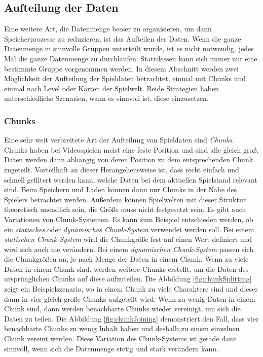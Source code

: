 \subsection{Aufteilung der Daten} 
Eine weitere Art, die Datenmenge besser zu organisieren, um dann Speicherprozesse zu reduzieren, ist das Aufteilen der Daten. Wenn die ganze Datenmenge in sinnvolle Gruppen unterteilt wurde, ist es nicht notwendig, jedes Mal die ganze Datenmenge zu durchlaufen. Stattdessen kann sich immer nur eine bestimmte Gruppe vorgenommen werden. In diesem Abschnitt werden zwei Möglichkeit der Aufteilung der Spieldaten betrachtet, einmal mit Chunks und einmal nach Level oder Karten der Spielwelt. Beide Strategien haben unterschiedliche Szenarien, wann es sinnvoll ist, diese einzusetzen.

\subsubsection{Chunks} \label{sssect:chunks}
Eine sehr weit verbreitete Art der Aufteilung von Spieldaten sind \textit{Chunks}. Chunks haben bei Videospielen meist eine feste Position und sind alle gleich groß. Daten werden dann abhängig von deren Position zu dem entsprechenden Chunk zugeteilt. Vorteilhaft an dieser Herangehensweise ist, dass recht einfach und schnell gefiltert werden kann, welche Daten bei dem aktuellen Spielstand relevant sind. Beim Speichern und Laden können dann nur Chunks in der Nähe des Spielers betrachtet werden. Außerdem können Spielwelten mit dieser Struktur theoretisch unendlich sein, die Größe muss nicht festgesetzt sein. Es gibt auch Variationen von Chunk-Systemen. Es kann zum Beispiel entschieden werden, ob ein \textit{statisches} oder \textit{dynamisches Chunk-System} verwendet werden soll. Bei einem \textit{statischen Chunk-System} wird die Chunkgröße fest auf einen Wert definiert und wird sich auch nie verändern. Bei einem \textit{dynamischen Chunk-System} passen sich die Chunkgrößen an, je nach Menge der Daten in einem Chunk. Wenn zu viele Daten in einem Chunk sind, werden weitere Chunks erstellt, um die Daten des ursprünglichen Chunks auf diese aufzuteilen. Die Abbildung \ref{fig:chunkSplitting} zeigt ein Beispielszenario, wo in einem Chunk zu viele Charaktere sind und dieser dann in vier gleich große Chunks aufgeteilt wird. Wenn zu wenig Daten in einem Chunk sind, dann werden benachbarte Chunks wieder vereinigt, um sich die Daten zu teilen. Die Abbildung \ref{fig:chunkJoining} demonstriert den Fall, dass vier benachbarte Chunks zu wenig Inhalt haben und deshalb zu einem einzelnen Chunk vereint werden. Diese Variation des Chunk-Systems ist gerade dann sinnvoll, wenn sich die Datenmenge stetig und stark verändern kann. 


